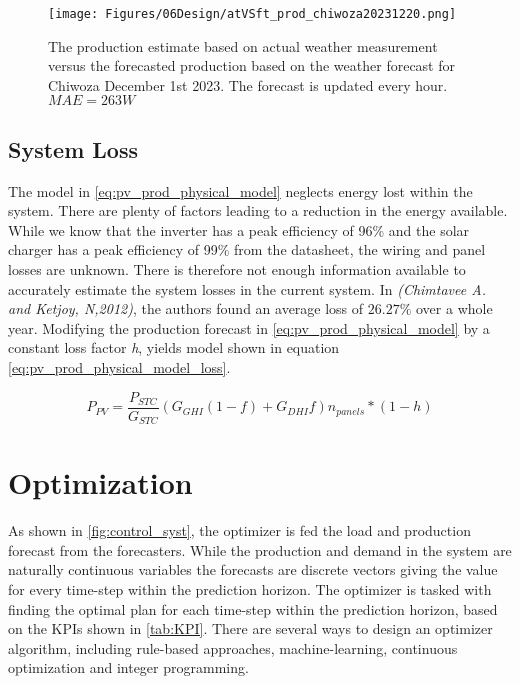 \begin{figure}
    \centering
    \texttt{[image: Figures/06Design/atVSft\_prod\_chiwoza20231220.png]}
    \caption[Forecasted vs estimated potential production hourly update]{The production estimate based on actual weather measurement versus the forecasted production based on the weather forecast for Chiwoza December 1st 2023. The forecast is updated every hour. $MAE = 263W$}
    \label{fig:atVSft_prod_chiwoza20231220}
\end{figure}

\subsection{System Loss}
The model in \ref{eq:pv_prod_physical_model} neglects energy lost within the system. There are plenty of factors leading to a reduction in the energy available. While we know that the inverter has a peak efficiency of 96\% and the solar charger has a peak efficiency of 99\% from the datasheet, the wiring and panel losses are unknown. There is therefore not enough information available to accurately estimate the system losses in the current system. In \textit{(Chimtavee A. and Ketjoy, N,2012)}, the authors found an average loss of $26.27\%$ over a whole year.\cite{Chimtavee2012-gg} Modifying the production forecast in \ref{eq:pv_prod_physical_model} by a constant loss factor \textit{h}, yields model shown in equation \ref{eq:pv_prod_physical_model_loss}.

\begin{equation}
    P_{PV} = \frac{P_{STC}}{G_{STC}}(G_{GHI}(1-f)+G_{DHI}f)n_{panels}*(1-h)
    \label{eq:pv_prod_physical_model_loss}
\end{equation}

\section{Optimization}\label{sec:optimization}

As shown in \ref{fig:control_syst}, the optimizer is fed the load and production forecast from the forecasters. While the production and demand in the system are naturally continuous variables the forecasts are discrete vectors giving the value for every time-step within the prediction horizon.  The optimizer is tasked with finding the optimal plan for each time-step within the prediction horizon, based on the KPIs shown in \ref{tab:KPI}. There are several ways to design an optimizer algorithm, including rule-based approaches, machine-learning, continuous optimization and integer programming.\\

